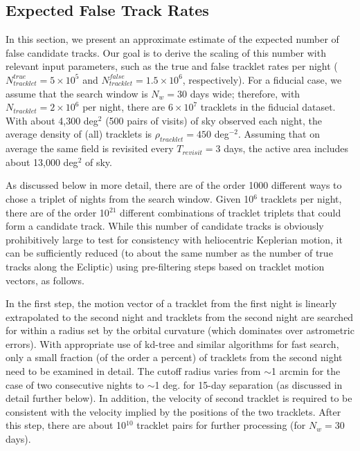 \subsection{Expected False Track Rates \label{sec:tracks} }

In this section, we present an approximate estimate of the expected number of false candidate tracks. 
Our goal is to derive the scaling of this number with relevant input parameters, such as the true and false 
tracklet rates per night ($N_{tracklet}^{true}=5\times10^5$ and $N_{tracklet}^{false}=1.5\times10^6$, respectively).
For a fiducial case, we assume that the search window is $N_w= 30$ days wide;  therefore, with $N_{tracklet} = 2\times10^6$ 
per night, there are $6\times10^7$ tracklets in the fiducial dataset. With about 4,300 deg$^2$ (500 pairs of visits) 
of sky observed each night, the average density of (all) tracklets is $\rho_{tracklet} = 450$ deg$^{-2}$. Assuming 
that on average the same field is revisited every $T_{revisit}=3$ days, the active area includes about 13,000 deg$^2$ 
of sky. 

As discussed below in more detail, there are of the order 1000 different ways to chose a triplet of nights 
from the search window. Given 10$^6$ tracklets per night, there are of the order 
10$^{21}$ different combinations of tracklet triplets that could form a candidate track. 
While this number of candidate tracks is obviously prohibitively large to test for consistency 
with heliocentric Keplerian motion, it can be sufficiently reduced (to about the same number
as the number of true tracks along the Ecliptic) using pre-filtering steps based on tracklet motion 
vectors, as follows.

In the first step, the motion vector of a tracklet from the first night is linearly extrapolated 
to the second night and tracklets from the second night are searched for within a radius set
by the orbital curvature (which dominates over astrometric errors). With appropriate use of
kd-tree and similar algorithms for fast search, only a small fraction (of the order a percent)
of tracklets from the second night need to be examined in detail. The cutoff radius varies
from $\sim$1 arcmin for the case of two consecutive nights to $\sim$1 deg. for 15-day separation 
(as discussed in detail further below). In addition, the velocity of second tracklet is required
to be consistent with the velocity implied by the positions of the two tracklets. After 
this step, there are about 10$^{10}$ tracklet pairs for further processing (for $N_w=30$ 
days). 

